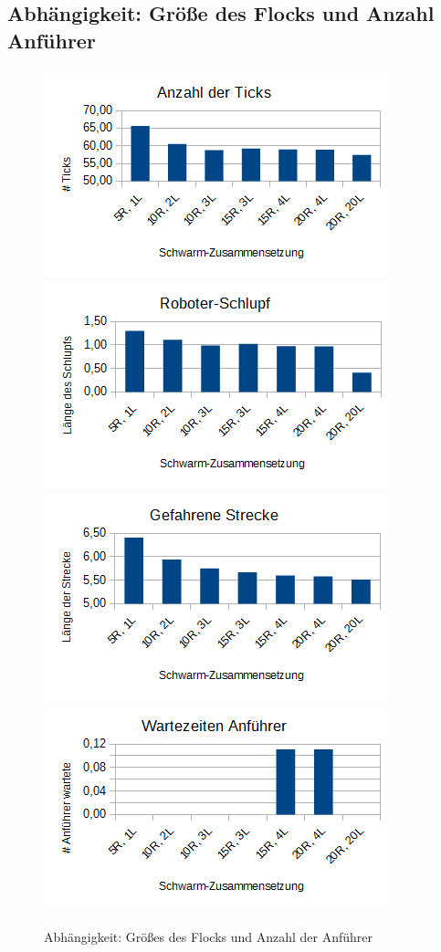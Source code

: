 \subsection*{Abhängigkeit: Größe des Flocks und Anzahl Anführer}

\begin{figure}[h]
	\includegraphics[width=\sectionTransportPictureWidth , keepaspectratio]{graphics/Statistics/Transport/Number_Observations.png}
	\includegraphics[width=\sectionTransportPictureWidth , keepaspectratio]{graphics/Statistics/Transport/Number_Slack.png}
	\includegraphics[width=\sectionTransportPictureWidth , keepaspectratio]{graphics/Statistics/Transport/Number_Way.png}
	\includegraphics[width=\sectionTransportPictureWidth , keepaspectratio]{graphics/Statistics/Transport/Number_Move.png}
	\caption{Abhängigkeit: Größes des Flocks und Anzahl der Anführer}
	\label{pic:TransportNumber}
\end{figure}


